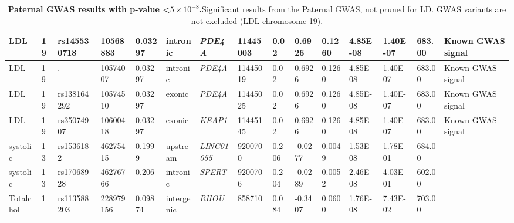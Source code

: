 \begin{landscape}
\begin{table}
\begin{adjustbox}{max width=\linewidth}
\begin{tabular}{@{}p{2cm}|p{0.5cm}p{2cm}p{2cm}p{1.5cm}p{3cm}p{2.5cm}p{1.5cm}p{1cm}p{2cm}p{2cm}p{2cm}p{2cm}p{1.5cm}p{4cm}@{}}
LDL&19&rs145530718&10568883&0.03297&intronic&\emph{PDE4A}&11445003&0.02&0.6926&0.1260&4.85E-08&1.40E-07&683.00&Known GWAS signal\\ \hline
LDL&19&.&10574007&0.03297&intronic&\emph{PDE4A}&11445019&0.02&0.6926&0.1260&4.85E-08&1.40E-07&683.00&Known GWAS signal\\ \hline
LDL&19&rs138164292&10574510&0.03297&exonic&\emph{PDE4A}&11445025&0.02&0.6926&0.1260&4.85E-08&1.40E-07&683.00&Known GWAS signal\\ \hline
LDL&19&rs35074907&10600418&0.03297&exonic&\emph{KEAP1}&11445145&0.02&0.6926&0.1260&4.85E-08&1.40E-07&683.00&Known GWAS signal\\ \hline
systolic&13&rs1536182&46275415&0.1999&upstream&\emph{LINC01055}&9200700&0.206&-0.0277&0.0049&1.53E-08&1.78E-01&684.00&\\ \hline
systolic&13&rs17068928&46276766&0.206&intronic&\emph{SPERT}&9200706&0.204&-0.0289&0.0052&2.46E-08&4.03E-01&602.00&\\ \hline
Totalchol&1&rs113588203&228979156&0.09874&intergenic&\emph{RHOU}&858710&0.084&-0.3407&0.0600&1.76E-08&7.43E-02&703.00&\\ \bottomrule
\end{tabular}
\end{adjustbox}
\caption[Paternal GWAS results with p-value \textless $5 \times 10^{-8}$. ]{\textbf{Paternal GWAS results with p-value \textless $5 \times 10^{-8}$.}Significant results from the Paternal GWAS, not pruned for LD. GWAS variants are not excluded (LDL chromosome 19).}
\label{tab:tab-s6}
\end{table}



\end{landscape}
